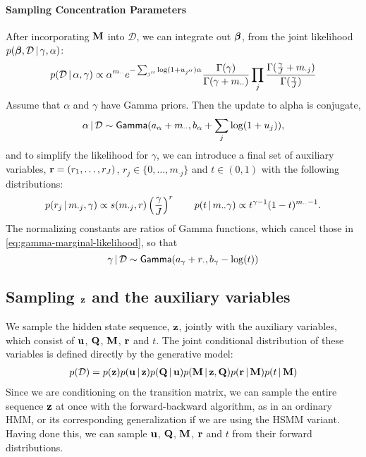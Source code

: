 \paragraph{Sampling Concentration Parameters}
\label{sec:sampling-alpha}
After incorporating $\mathbf{M}$ into $\mathcal{D}$, we can integrate out
$\boldsymbol{\beta}$, from the joint likelihood $p(\boldsymbol{\beta},\mathcal{D} \, \vert \, \gamma, \alpha)$:
\begin{align}
\label{eq:gamma-marginal-likelihood}
  p(\mathcal{D} \, \vert \, \alpha, \gamma) \propto
  \alpha^{m_{\cdot\cdot}} e^{-\sum_{j''} \log(1+u_{j''}) \alpha}
  \frac{\Gamma(\gamma)}{\Gamma(\gamma + m_{\cdot\cdot})}
  \prod_j
  \frac{\Gamma(\frac{\gamma}{J} + m_{\cdot
      j})}{\Gamma(\frac{\gamma}{J}) } 
\end{align}
Assume that $\alpha$ and $\gamma$ have Gamma priors.  Then
the update to alpha is conjugate,
\begin{equation}
  \label{eq:alpha-posterior}
  \alpha \, \vert \, \mathcal{D} \sim \mathsf{Gamma}(a_{\alpha}
    + m_{\cdot\cdot},b_\alpha + \sum_j\log(1+u_j)),
\end{equation}
and to simplify the likelihood for $\gamma$, we can introduce a final
set of auxiliary variables, $\mathbf{r} = (r_1, \dots,
r_J)$, $r_j \in \{0,\dots,m_{\cdot j}\}$ and $t \in (0,1)$ with the following distributions:
\begin{align}
  \label{eq:9}
  p(r_j \, \vert \, m_{\cdot j}, \gamma) \propto s(m_{\cdot j}, r)
    \left(\frac{\gamma}{J}\right)^r \qquad
  p(t \, \vert \, m_{\cdot\cdot} \gamma) \propto 
    t^{\gamma - 1} (1-t)^{m_{\cdot\cdot} - 1}.
\end{align}
The normalizing constants are ratios of Gamma functions, which cancel
those in \eqref{eq:gamma-marginal-likelihood}, so that
\begin{equation}
  \label{eq:18}
  \gamma \, \vert \, \mathcal{D} \sim \mathsf{Gamma}(a_{\gamma} + r_{\cdot},b_{\gamma} - \log(t))
\end{equation}

\subsection{Sampling \texorpdfstring{$\mathbf{z}$}{the latent state sequece} and the auxiliary variables}
\label{sec:sampling-z_t}

We sample the hidden state sequence, $\mathbf{z}$, jointly with the auxiliary
variables, which consist of $\mathbf{u}$, $\mathbf{Q}$, $\mathbf{M}$, $\mathbf{r}$ and $t$.  The
joint conditional distribution of these variables is defined directly
by the generative model:
\begin{align}
  \label{eq:19}
  p(\mathcal{D}) = p(\mathbf{z}) p(\mathbf{u} \, \vert \, \mathbf{z}) p(\mathbf{Q} \, \vert \,
  \mathbf{u}) p(\mathbf{M} \, \vert \, \mathbf{z}, \mathbf{Q}) p(\mathbf{r} \, \vert \, \mathbf{M}) p(t
  \, \vert \,\mathbf{M})
\end{align}
Since we are conditioning on the transition matrix, we can
sample the entire sequence $\mathbf{z}$ at once with the forward-backward algorithm,
as in an ordinary HMM, or its corresponding generalization if we are
using the HSMM variant.  Having done this, we can sample $\mathbf{u}$, $\mathbf{Q}$, $\mathbf{M}$,
$\mathbf{r}$ and $t$ from their forward distributions.

